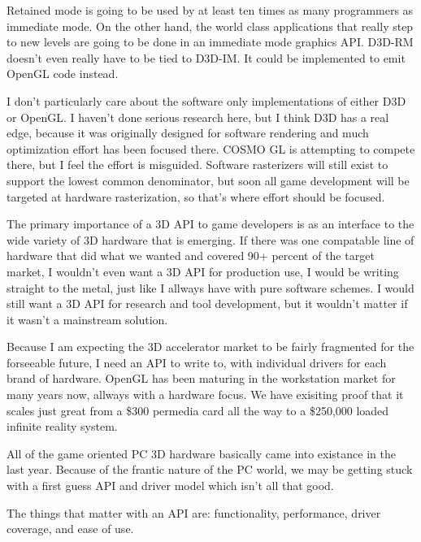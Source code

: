\begin{allintypewriter}
Retained mode is going to be used by at least ten times as many programmers as 
immediate mode. On the other hand, the world class applications that really step to new 
levels are going to be done in an immediate mode graphics API. D3D-RM doesn't even really 
have to be tied to D3D-IM. It could be implemented to emit OpenGL code instead.\\ 
\par
I don't particularly care about the software only implementations of either D3D or OpenGL. 
I haven't done serious research here, but I think D3D has a real edge, because it was 
originally designed for software rendering and much optimization effort has been focused 
there. COSMO GL is attempting to compete there, but I feel the effort is misguided. 
Software rasterizers will still exist to support the lowest common denominator, but soon 
all game development will be targeted at hardware rasterization, so that's where effort 
should be focused.\\ 
\par
The primary importance of a 3D API to game developers is as an interface to the wide 
variety of 3D hardware that is emerging. If there was one compatable line of hardware 
that did what we wanted and covered 90+ percent of the target market, I wouldn't even 
want a 3D API for production use, I would be writing straight to the metal, just like 
I allways have with pure software schemes. I would still want a 3D API for research and 
tool development, but it wouldn't matter if it wasn't a mainstream solution.\\ 
\par
Because I am expecting the 3D accelerator market to be fairly fragmented for the 
forseeable future, I need an API to write to, with individual drivers for each brand of 
hardware. OpenGL has been maturing in the workstation market for many years now, allways 
with a hardware focus. We have exisiting proof that it scales just great from a \$300 
permedia card all the way to a \$250,000 loaded infinite reality system.\\ 
\par
All of the game oriented PC 3D hardware basically came into existance in the last year. 
Because of the frantic nature of the PC world, we may be getting stuck with a first guess 
API and driver model which isn't all that good.\\ 
\par
The things that matter with an API are: functionality, performance, driver coverage, and
ease of use.\\ 

\end{allintypewriter}
